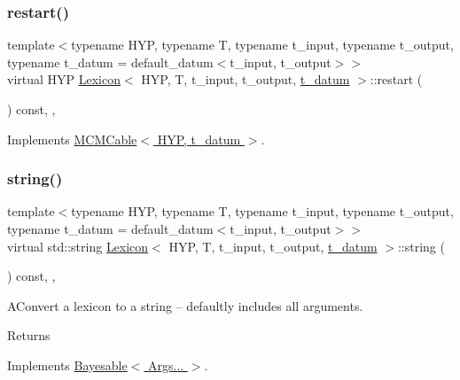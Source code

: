 \subsubsection{\texorpdfstring{restart()}{restart()}}
{\footnotesize\ttfamily template$<$typename H\+YP, typename T, typename t\+\_\+input, typename t\+\_\+output, typename t\+\_\+datum = default\+\_\+datum$<$t\+\_\+input, t\+\_\+output$>$$>$ \\
virtual H\+YP \hyperlink{class_lexicon}{Lexicon}$<$ H\+YP, T, t\+\_\+input, t\+\_\+output, \hyperlink{class_bayesable_a7c93a2eeab708378eb321745908718d4}{t\+\_\+datum} $>$\+::restart (\begin{DoxyParamCaption}{ }\end{DoxyParamCaption}) const\hspace{0.3cm}{\ttfamily [inline]}, {\ttfamily [override]}, {\ttfamily [virtual]}}



Implements \hyperlink{class_m_c_m_cable_a220d6c4ca73e20441c14fa5bd3e090d3}{M\+C\+M\+Cable$<$ H\+Y\+P, t\+\_\+datum $>$}.

\mbox{\label{class_lexicon_aad37474da522d811415c1ba45ca72dff}} 
\subsubsection{\texorpdfstring{string()}{string()}}
{\footnotesize\ttfamily template$<$typename H\+YP, typename T, typename t\+\_\+input, typename t\+\_\+output, typename t\+\_\+datum = default\+\_\+datum$<$t\+\_\+input, t\+\_\+output$>$$>$ \\
virtual std\+::string \hyperlink{class_lexicon}{Lexicon}$<$ H\+YP, T, t\+\_\+input, t\+\_\+output, \hyperlink{class_bayesable_a7c93a2eeab708378eb321745908718d4}{t\+\_\+datum} $>$\+::string (\begin{DoxyParamCaption}{ }\end{DoxyParamCaption}) const\hspace{0.3cm}{\ttfamily [inline]}, {\ttfamily [override]}, {\ttfamily [virtual]}}

A\+Convert a lexicon to a string -- defaultly includes all arguments. \begin{DoxyReturn}{Returns}

\end{DoxyReturn}


Implements \hyperlink{class_bayesable_a2ec58e98bf37a90ac3d45a7713c6d5ea}{Bayesable$<$ Args... $>$}.



